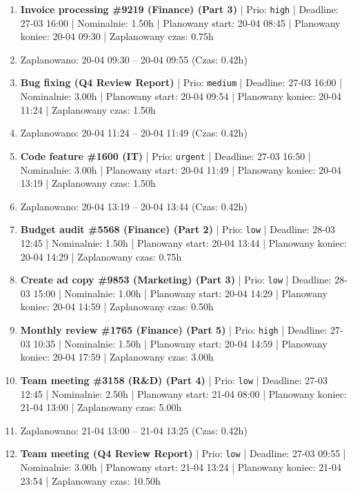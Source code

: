 {\begin{enumerate}
  \item [\textbf{14622}] \textbf{Invoice processing \#9219 (Finance) (Part 3)} | Prio: \texttt{high} | Deadline: 27-03 16:00 | Nominalnie: 1.50h | Planowany start: 20-04 08:45 | Planowany koniec: 20-04 09:30 | Zaplanowany czas: 0.75h
  \item [\textbf{PRZERWA}] Zaplanowano: 20-04 09:30 -- 20-04 09:55 (Czas: 0.42h)
  \item [\textbf{14647}] \textbf{Bug fixing (Q4 Review Report)} | Prio: \texttt{medium} | Deadline: 27-03 16:00 | Nominalnie: 3.00h | Planowany start: 20-04 09:54 | Planowany koniec: 20-04 11:24 | Zaplanowany czas: 1.50h
  \item [\textbf{PRZERWA}] Zaplanowano: 20-04 11:24 -- 20-04 11:49 (Czas: 0.42h)
  \item [\textbf{14605}] \textbf{Code feature \#1600 (IT)} | Prio: \texttt{urgent} | Deadline: 27-03 16:50 | Nominalnie: 3.00h | Planowany start: 20-04 11:49 | Planowany koniec: 20-04 13:19 | Zaplanowany czas: 1.50h
  \item [\textbf{PRZERWA}] Zaplanowano: 20-04 13:19 -- 20-04 13:44 (Czas: 0.42h)
  \item [\textbf{14693}] \textbf{Budget audit \#5568 (Finance) (Part 2)} | Prio: \texttt{low} | Deadline: 28-03 12:45 | Nominalnie: 1.50h | Planowany start: 20-04 13:44 | Planowany koniec: 20-04 14:29 | Zaplanowany czas: 0.75h
  \item [\textbf{14679}] \textbf{Create ad copy \#9853 (Marketing) (Part 3)} | Prio: \texttt{low} | Deadline: 28-03 15:00 | Nominalnie: 1.00h | Planowany start: 20-04 14:29 | Planowany koniec: 20-04 14:59 | Zaplanowany czas: 0.50h
  \item [\textbf{14627}] \textbf{Monthly review \#1765 (Finance) (Part 5)} | Prio: \texttt{high} | Deadline: 27-03 10:35 | Nominalnie: 1.50h | Planowany start: 20-04 14:59 | Planowany koniec: 20-04 17:59 | Zaplanowany czas: 3.00h
  \item [\textbf{14688}] \textbf{Team meeting \#3158 (R\&D) (Part 4)} | Prio: \texttt{low} | Deadline: 27-03 12:45 | Nominalnie: 2.50h | Planowany start: 21-04 08:00 | Planowany koniec: 21-04 13:00 | Zaplanowany czas: 5.00h
  \item [\textbf{PRZERWA}] Zaplanowano: 21-04 13:00 -- 21-04 13:25 (Czas: 0.42h)
  \item [\textbf{14682}] \textbf{Team meeting (Q4 Review Report)} | Prio: \texttt{low} | Deadline: 27-03 09:55 | Nominalnie: 3.00h | Planowany start: 21-04 13:24 | Planowany koniec: 21-04 23:54 | Zaplanowany czas: 10.50h
\end{enumerate}
}


